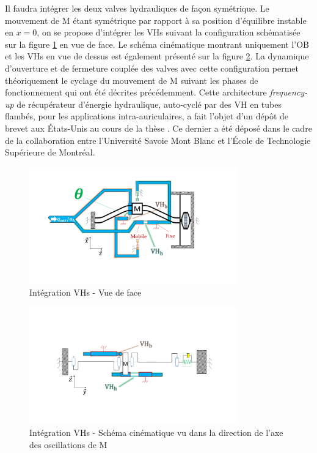 Il faudra intégrer les deux valves hydrauliques de façon symétrique. Le mouvement de M étant symétrique par rapport à sa position d'équilibre instable en $x=0$, on se propose d'intégrer les VHs suivant la configuration schématisée sur la figure \ref{fig:integration_VH_face} en vue de face. Le schéma cinématique montrant uniquement l'OB et les VHs en vue de dessus est également présenté sur la figure \ref{fig:integration_VH_dessus}. La dynamique d'ouverture et de fermeture couplée des valves avec cette configuration permet théoriquement le cyclage du mouvement de M suivant les phases de fonctionnement qui ont été décrites précédemment. Cette architecture \emph{frequency-up} de récupérateur d'énergie hydraulique, auto-cyclé par des VH en tubes flambés, pour les applications intra-auriculaires, a fait l'objet d'un dépôt de brevet aux États-Unis au cours de la thèse \cite{Avetissian2021}. Ce dernier a été déposé dans le cadre de la collaboration entre l'Université Savoie Mont Blanc et l'École de Technologie Supérieure de Montréal.
\begin{figure}[!htb]
	\begin{center}
		\captionsetup{justification=centering}
		\includegraphics[trim={3cm 4cm 6cm 2cm},clip,width=0.8\textwidth]{../Chap2/Figure/integration_VH_face.pdf}
		\caption{Intégration VHs - Vue de face}
		\label{fig:integration_VH_face}
	\end{center}
\end{figure}
\begin{figure}[!htbp]
	\begin{center}
		\captionsetup{justification=centering}
		\includegraphics[trim={4cm 4.5cm 4cm 5cm},clip,width=0.8\textwidth]{../Chap2/Figure/integration_VH_dessus.pdf}
		\caption{Intégration VHs - Schéma cinématique vu dans la direction de l'axe des oscillations de M}
		\label{fig:integration_VH_dessus}
	\end{center}
\end{figure}

